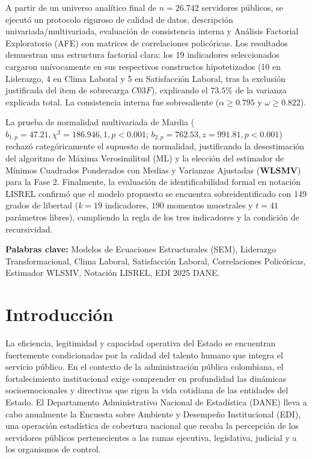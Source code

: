 \documentclass[11pt, a4paper]{article} %
\begin{document}
A partir de un universo analítico final de $n = 26.742$ servidores públicos, se ejecutó un protocolo riguroso de calidad de datos, descripción univariada/multivariada, evaluación de consistencia interna y Análisis Factorial Exploratorio (AFE) con matrices de correlaciones policóricas. Los resultados demuestran una estructura factorial clara: los 19 indicadores seleccionados cargaron unívocamente en sus respectivos constructos hipotetizados (10 en Liderazgo, 4 en Clima Laboral y 5 en Satisfacción Laboral, tras la exclusión justificada del ítem de sobrecarga $C03F$), explicando el $73.5\%$ de la varianza explicada total. La consistencia interna fue sobresaliente ($\alpha \ge 0.795$ y $\omega \ge 0.822$).

La prueba de normalidad multivariada de Mardia ($b_{1,p} = 47.21, \chi^2 = 186.946,1, p < 0.001$; $b_{2,p} = 762.53, z = 991.81, p < 0.001$) rechazó categóricamente el supuesto de normalidad, justificando la desestimación del algoritmo de Máxima Verosimilitud (ML) y la elección del estimador de Mínimos Cuadrados Ponderados con Medias y Varianzas Ajustadas (\textbf{WLSMV}) para la Fase 2. Finalmente, la evaluación de identificabilidad formal en notación LISREL confirmó que el modelo propuesto se encuentra sobreidentificado con 149 grados de libertad ($k = 19$ indicadores, $190$ momentos muestrales y $t = 41$ parámetros libres), cumpliendo la regla de los tres indicadores y la condición de recursividad.

\vspace{0.3cm}
\noindent \textbf{Palabras clave:} Modelos de Ecuaciones Estructurales (SEM), Liderazgo Transformacional, Clima Laboral, Satisfacción Laboral, Correlaciones Policóricas, Estimador WLSMV, Notación LISREL, EDI 2025 DANE.

\section{Introducción}

La eficiencia, legitimidad y capacidad operativa del Estado se encuentran fuertemente condicionadas por la calidad del talento humano que integra el servicio público. En el contexto de la administración pública colombiana, el fortalecimiento institucional exige comprender en profundidad las dinámicas socioemocionales y directivas que rigen la vida cotidiana de las entidades del Estado. El Departamento Administrativo Nacional de Estadística (DANE) lleva a cabo anualmente la Encuesta sobre Ambiente y Desempeño Institucional (EDI), una operación estadística de cobertura nacional que recaba la percepción de los servidores públicos pertenecientes a las ramas ejecutiva, legislativa, judicial y a los organismos de control.
\end{document}
